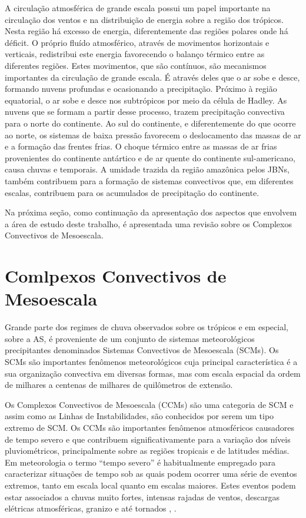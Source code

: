 A circulação atmosférica de grande escala possui um papel importante na circulação dos ventos e na distribuição de energia sobre a região dos trópicos. Nesta região há excesso de energia, diferentemente das regiões polares onde há déficit. O próprio fluído atmosférico, através de movimentos horizontais e verticais, redistribui este energia favorecendo o balanço térmico entre as diferentes regiões. Estes movimentos, que são contínuos, são mecanismos importantes da circulação de grande escala. É através deles que o ar sobe e desce, formando nuvens profundas e ocasionando a precipitação. Próximo à região equatorial, o ar sobe e desce nos subtrópicos por meio da célula de Hadley. As nuvens que se formam a partir desse processo, trazem precipitação convectiva para o norte do continente. Ao sul do continente, e diferentemente do que ocorre ao norte, os sistemas de baixa pressão favorecem o deslocamento das massas de ar e a formação das frentes frias. O choque térmico entre as massas de ar frias provenientes do continente antártico e de ar quente do continente sul-americano, causa chuvas e temporais. A umidade trazida da região amazônica pelos JBNs, também contribuem para a formação de sistemas convectivos que, em diferentes escalas, contribuem para os acumulados de precipitação do continente.

Na próxima seção, como continuação da apresentação dos aspectos que envolvem a área de estudo deste trabalho, é apresentada uma revisão sobre os Complexos Convectivos de Mesoescala.

\section{Comlpexos Convectivos de Mesoescala}
\label{ss:ccm}

Grande parte dos regimes de chuva observados sobre os trópicos e em especial, sobre a AS, é proveniente de um conjunto de sistemas meteorológicos precipitantes denominados Sistemas Convectivos de Mesoescala (SCMs). Os SCMs são importantes fenômenos meteorológicos cuja principal característica é a sua organização convectiva em diversas formas, mas com escala espacial da ordem de milhares a centenas de milhares de quilômetros de extensão.

Os Complexos Convectivos de Mesoescala (CCMs) são uma categoria de SCM e assim como as Linhas de Instabilidades, são conhecidos por serem um tipo extremo de SCM. Os CCMs são importantes fenômenos atmosféricos causadores de tempo severo e que contribuem significativamente para a variação dos níveis pluviométricos, principalmente sobre as regiões tropicais e de latitudes médias. Em meteorologia o termo ``tempo severo'' é habitualmente empregado para caracterizar situações de tempo sob as quais podem ocorrer uma série de eventos extremos, tanto em escala local quanto em escalas maiores. Estes eventos podem estar associados a chuvas muito fortes, intensas rajadas de ventos, descargas elétricas atmosféricas, granizo e até tornados \cite{maddox80}, \cite{menezessilvadias04}.

